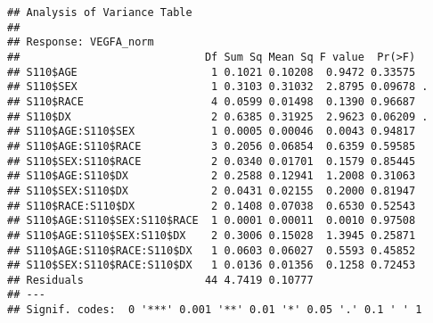 \documentclass[]{article}
\begin{document}
\begin{verbatim}
## Analysis of Variance Table
## 
## Response: VEGFA_norm
##                             Df Sum Sq Mean Sq F value  Pr(>F)  
## S110$AGE                     1 0.1021 0.10208  0.9472 0.33575  
## S110$SEX                     1 0.3103 0.31032  2.8795 0.09678 .
## S110$RACE                    4 0.0599 0.01498  0.1390 0.96687  
## S110$DX                      2 0.6385 0.31925  2.9623 0.06209 .
## S110$AGE:S110$SEX            1 0.0005 0.00046  0.0043 0.94817  
## S110$AGE:S110$RACE           3 0.2056 0.06854  0.6359 0.59585  
## S110$SEX:S110$RACE           2 0.0340 0.01701  0.1579 0.85445  
## S110$AGE:S110$DX             2 0.2588 0.12941  1.2008 0.31063  
## S110$SEX:S110$DX             2 0.0431 0.02155  0.2000 0.81947  
## S110$RACE:S110$DX            2 0.1408 0.07038  0.6530 0.52543  
## S110$AGE:S110$SEX:S110$RACE  1 0.0001 0.00011  0.0010 0.97508  
## S110$AGE:S110$SEX:S110$DX    2 0.3006 0.15028  1.3945 0.25871  
## S110$AGE:S110$RACE:S110$DX   1 0.0603 0.06027  0.5593 0.45852  
## S110$SEX:S110$RACE:S110$DX   1 0.0136 0.01356  0.1258 0.72453  
## Residuals                   44 4.7419 0.10777                  
## ---
## Signif. codes:  0 '***' 0.001 '**' 0.01 '*' 0.05 '.' 0.1 ' ' 1
\end{verbatim}
\end{document}
